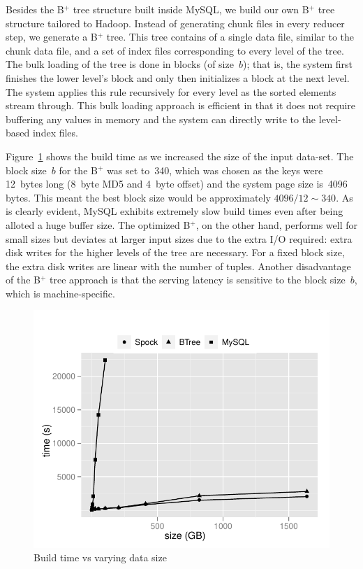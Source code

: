 Besides the B$^{+}$ tree structure built inside MySQL, we build our
own B$^{+}$ tree structure tailored to Hadoop. Instead of generating
chunk files in every reducer step, we generate a B$^{+}$ tree. This
tree contains of a single data file, similar to the chunk data file,
and a set of index files corresponding to every level of the tree. The
bulk loading of the tree is done in blocks (of size~$b$); that is, the
system first finishes the lower level's block and only then
initializes a block at the next level. The system applies this rule
recursively for every level as the sorted elements stream through.
This bulk loading approach is efficient in that it does not require
buffering any values in memory and the system can directly write to
the level-based index files. 

Figure~\ref{build} shows the build time as we increased the size of
the input data-set. The block size~$b$ for the B$^{+}$ was set to~340,
which was chosen as the keys were 12~bytes long (8~byte MD5 and 4~byte
offset) and the system page size is~4096 bytes. This meant the best
block size would be approximately $4096/12 \sim 340$. As is clearly
evident, MySQL exhibits extremely slow build times even after being
alloted a huge buffer size. The optimized B$^{+}$, on the other hand,
performs well for small sizes but deviates at larger input sizes due
to the extra I/O required: extra disk writes for the higher levels of
the tree are necessary. For a fixed block size, the extra disk writes
are linear with the number of tuples.  Another disadvantage of the
B$^{+}$ tree approach is that the serving latency is sensitive to the
block size~$b$, which is machine-specific. 

\begin{figure}
  \centering
    \includegraphics[scale=0.55]{images/build.pdf}
  \caption{Build time vs varying data size}
  \label{build}
\end{figure}

